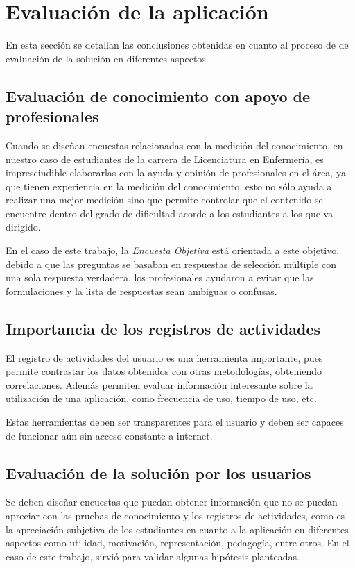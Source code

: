 \section{Evaluación de la aplicación}

En esta sección se detallan las conclusiones obtenidas en cuanto al proceso de
de evaluación de la solución en diferentes aspectos.

\subsection{Evaluación de conocimiento con apoyo de profesionales}

Cuando se diseñan encuestas relacionadas con la medición del conocimiento, en
nuestro caso de estudiantes de la carrera de Licenciatura en Enfermería, es
imprescindible elaborarlas con la ayuda y opinión de profesionales en el área,
ya que tienen experiencia en la medición del conocimiento, esto no sólo ayuda a
realizar una mejor medición sino que permite controlar que el contenido se
encuentre dentro del grado de dificultad acorde a los estudiantes a los que va
dirigido. 

En el caso de este trabajo, la \emph{Encuesta Objetiva} está orientada a este
objetivo, debido a que las preguntas se basaban en respuestas de selección
múltiple con una sola respuesta verdadera, los profesionales ayudaron a evitar
que las formulaciones y la lista de respuestas sean ambiguas o confusas.


\subsection{Importancia de los registros de actividades}

El registro de actividades del usuario es una herramienta importante, pues
permite contrastar los datos obtenidos con otras metodologías, obteniendo
correlaciones. Además permiten evaluar información interesante sobre la
utilización de una aplicación, como frecuencia de uso, tiempo de uso, etc.

Estas herramientas deben ser transparentes para el usuario y deben ser capaces
de funcionar aún sin acceso constante a internet.

\subsection{Evaluación de la solución por los usuarios}

Se deben diseñar encuestas que puedan obtener información que no se puedan
apreciar con las pruebas de conocimiento y los registros de actividades, como es
la apreciación subjetiva de los estudiantes en cuanto a la aplicación en
diferentes aspectos como utilidad, motivación, representación, pedagogía, entre
otros. En el caso de este trabajo, sirvió para validar algunas hipótesis
planteadas.


